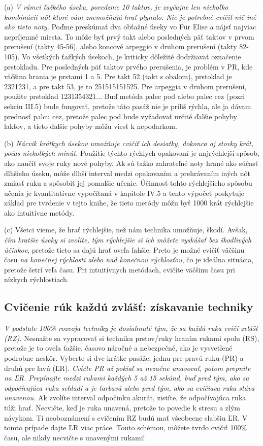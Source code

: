 (a) \emph{V rámci ťažkého úseku, povedzme 10 taktov, je zvyčajne len niekoľko kombinácií nôt ktoré vám znemožňujú hrať plynulo. Nie je potrebné cvičiť nič iné ako tieto noty.} Poďme preskúmať dva obťažné úseky vo Für Elise a nájsť najviac nepríjemné miesta. To môže byť prvý takt alebo posledných päť taktov v prvom prerušení (takty 45-56), alebo koncové arpeggio v druhom prerušení (takty 82-105). Vo všetkých ťažkých úsekoch, je kriticky dôležité dodržiavať označenie prstokladu. Pre posledných päť taktov prvého prerušenia, je problém v PR, kde väčšina hrania je prstami 1 a 5. Pre takt 52 (takt s obalom), prstoklad je 2321231, a pre takt 53, je to 251515151525. Pre arpeggia v druhom prerušení, použite prstoklad 1231354321... Buď metóda palec pod alebo palec cez (pozri sekciu III.5) bude fungovať, pretože táto pasáž nie je príliš rýchla, ale ja dávam prednosť palcu cez, pretože palec pod bude vyžadovať určité ďalšie pohyby lakťov, a tieto ďalšie pohyby môžu viesť k nepodarkom.

(b) \emph{Nácvik krátkych úsekov umožňuje cvičiť ich desiatky, dokonca aj stovky krát, počas niekoľkých minút.} Použitie týchto rýchlych opakovaní je najrýchlejší spôsob, ako naučiť svoje ruky nové pohyby. Ak sú ťažko zahrateľné noty hrané ako súčasť dlhšieho úseku, môže dlhší interval medzi opakovaním a prehrávaním iných nôt zmiasť ruku a spôsobiť jej pomalšie učenie.  Účinnosť tohto rýchlejšieho spôsobu učenia je kvantitatívne vypočítaná v kapitole IV.5 a tento výpočet poskytuje základ pre tvrdenie v tejto knihe, že tieto metódy môžu byť 1000 krát rýchlejšie ako intuitívne metódy.

(c) Všetci vieme, že hrať rýchlejšie, než nám technika umožňuje, škodí. Avšak, \emph{čím kratšie úseky si zvolíte, tým rýchlejšie si ich môžete vyskúšať bez škodlivých účinkov}, pretože tieto sa dajú hrať oveľa ľahšie. Preto je možné cvičiť väčšinu času \textit{na konečnej rýchlosti alebo nad konečnou rýchlosťou}, čo je ideálna situácia, pretože šetrí veľa času. Pri intuitívnych metódach, cvičíte väčšinu času pri nízkych rýchlostiach.

\subsection{Cvičenie rúk každú zvlášť: získavanie techniky}
\emph{V podstate 100\%  rozvoja techniky je dosiahnuté tým, že sa každá ruka cvičí zvlášť (RZ).} Nesnažte sa vypracovať si techniku prstov/ruky hraním rukami spolu (RS), pretože je to oveľa ťažšie, časovo náročné a nebezpečné, ako je vysvetlené podrobne neskôr. Vyberte si dve krátke pasáže, jednu pre pravú ruku (PR) a druhú pre ľavú (ĽR). \emph{Cvičte PR až pokiaľ sa nezačne unavovať, potom prepnite na ĽR. Prepínajte medzi rukami každých 5 až 15 sekúnd, buď pred tým, ako sa odpočívajúca ruka schladí a je ťarbavá alebo pred tým, ako sa cvičiaca ruka stáva unavenou.} Ak zvolíte interval odpočinku akurát, zistíte, že odpočívajúca ruka túži hrať. Necvičte, keď je ruka unavená, pretože to povedie k stresu a zlým návykom. Tí neoboznámení s cvičením RZ budú mať všeobecne slabšiu ĽR. V tomto prípade dajte ĽR viac práce. Touto schémou, môžete tvrdo cvičiť 100\% času, ale nikdy necvičte s unavenými rukami!

